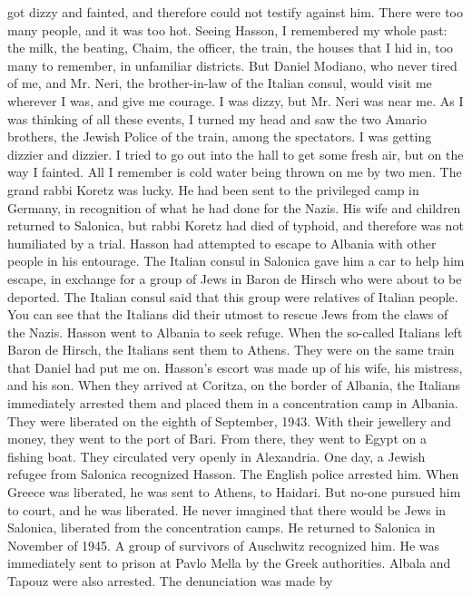 got dizzy and fainted, and therefore could not testify against him.
There 
were too many people, and it was too hot.
Seeing Hasson, I remembered my 
whole past: the milk, the beating, Chaim, the officer, the train, the 
houses that I hid in, too many to remember, in unfamiliar districts.
But 
Daniel Modiano, who never tired of me, and Mr.
Neri, the brother-in-law 
of the Italian consul, would visit me wherever I was, and give me courage.
I was dizzy, but Mr.
Neri was near me.
As I was thinking of all these events, I turned my head and saw the 
two Amario brothers, the Jewish Police of the train, among the spectators.
I was getting dizzier and dizzier.
I tried to go out into the 
hall to get some fresh air, but on the way I fainted.
All I remember 
is cold water being thrown on me by two men.
The grand rabbi Koretz was lucky.
He had been sent to the privileged camp in Germany, in recognition of what he had done for the Nazis.
His wife and children returned to Salonica, but rabbi Koretz had died 
of typhoid, and therefore was not humiliated by a trial.
Hasson had attempted to escape to Albania with other people in his 
entourage.
The Italian consul in Salonica gave him a car to help him escape, in exchange for a group of Jews in Baron de Hirsch who were about to be deported.
The Italian consul said that this group were relatives of Italian people.
You can see that the Italians did their 
utmost to rescue Jews from the claws of the Nazis.
Hasson went to Albania to seek refuge.
When the so-called Italians 
left Baron de Hirsch, the Italians sent them to Athens.
They were on the 
same train that Daniel had put me on.
Hasson's escort was made up of his wife, his mistress, and his son.
When they arrived at Coritza, on the border of Albania, the Italians immediately arrested them and placed them in a concentration camp in Albania.
They were liberated on the eighth of September, 1943.
With their 
jewellery and money, they went to the port of Bari.
From there, they 
went to Egypt on a fishing boat.
They circulated very openly in Alexandria.
One day, a Jewish refugee from Salonica recognized Hasson.
The English police arrested him.
When Greece was liberated, he was sent to Athens, to Haidari.
But no-one pursued him to court, and he was liberated.
He never imagined that there would be Jews in Salonica, liberated 
from the concentration camps.
He returned to Salonica in November of 
1945.
A group of survivors of Auschwitz recognized him.
He was immediately sent to prison at Pavlo Mella by the Greek authorities.
Albala and Tapouz were also arrested.
The denunciation was made by 
